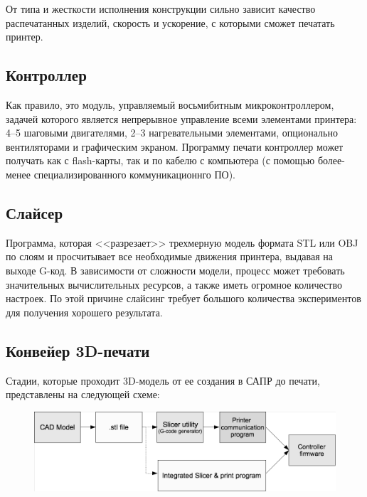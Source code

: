 \documentclass[10pt, a5paper]{article}
\begin{document}
От типа и жесткости исполнения конструкции сильно зависит качество распечатанных изделий, скорость и ускорение, с которыми сможет печатать принтер.

\subsection*{Контроллер}

Как правило, это модуль, управляемый восьмибитным микроконтроллером, задачей которого является непрерывное управление всеми элементами принтера: 4--5 шаговыми двигателями, 2--3 нагревательными элементами, опционально вентиляторами и графическим экраном. Программу печати контроллер может получать как с flash-карты, так и по кабелю с компьютера (с помощью более-менее специализированного коммуникационнго ПО).

\subsection*{Слайсер}

Программа, которая <<разрезает>> трехмерную модель формата STL или OBJ по слоям и просчитывает все необходимые движения принтера, выдавая на выходе G-код. В зависимости от сложности модели, процесс может требовать значительных вычислительных ресурсов, а также иметь огромное количество настроек. По этой причине слайсинг требует большого количества экспериментов для получения хорошего результата.

\subsection*{Конвейер 3D-печати}

Стадии, которые проходит 3D-модель от ее создания в САПР до печати, представлены на следующей схеме:

\begin{figure}[h!]
  \centering
  \includegraphics[scale=0.3]{19_2015_fig1}
\end{figure}
\end{document}

